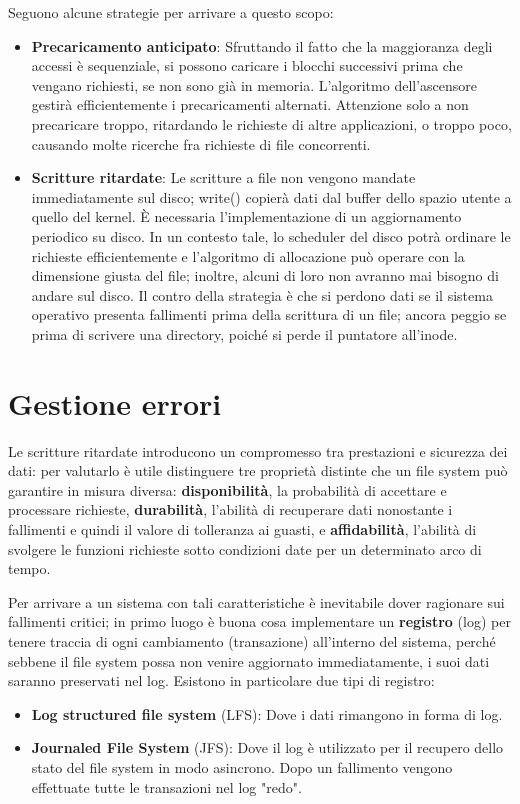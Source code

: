 Seguono alcune strategie per arrivare a questo scopo: \begin{itemize}
    \item \textbf{Precaricamento anticipato}: Sfruttando il fatto che la maggioranza degli accessi è sequenziale, si possono caricare i blocchi
    successivi prima che vengano richiesti, se non sono già in memoria. L'algoritmo dell'ascensore gestirà efficientemente i precaricamenti alternati.
    Attenzione solo a non precaricare troppo, ritardando le richieste di altre applicazioni, o troppo poco, causando molte ricerche fra richieste di
    file concorrenti.
    \item \textbf{Scritture ritardate}: Le scritture a file non vengono mandate immediatamente sul disco; write() copierà dati dal buffer dello spazio
    utente a quello del kernel. È necessaria l'implementazione di un aggiornamento periodico su disco. In un contesto tale, lo scheduler del disco potrà
    ordinare le richieste efficientemente e l'algoritmo di allocazione può operare con la dimensione giusta del file; inoltre, alcuni di loro non
    avranno mai bisogno di andare sul disco. Il contro della strategia è che si perdono dati se il sistema operativo presenta fallimenti prima della
    scrittura di un file; ancora peggio se prima di scrivere una directory, poiché si perde il puntatore all'inode.
\end{itemize}

%

\section{Gestione errori} %
Le scritture ritardate introducono un compromesso tra prestazioni e sicurezza dei dati: per valutarlo è utile distinguere tre proprietà distinte che un
file system può garantire in misura diversa: \textbf{disponibilità}, la probabilità di accettare e processare richieste, \textbf{durabilità}, l'abilità
di recuperare dati nonostante i fallimenti e quindi il valore di tolleranza ai guasti, e \textbf{affidabilità}, l'abilità di svolgere le funzioni
richieste sotto condizioni date per un determinato arco di tempo.\par
Per arrivare a un sistema con tali caratteristiche è inevitabile dover ragionare sui fallimenti critici; in primo luogo è buona cosa implementare un
\textbf{registro} (log) per tenere traccia di ogni cambiamento (transazione) all'interno del sistema, perché sebbene il file system possa non venire
aggiornato immediatamente, i suoi dati saranno preservati nel log. Esistono in particolare due tipi di registro: \begin{itemize}
    \item \textbf{Log structured file system} (LFS): Dove i dati rimangono in forma di log.
    \item \textbf{Journaled File System} (JFS): Dove il log è utilizzato per il recupero dello stato del file system in modo asincrono. Dopo un
    fallimento vengono effettuate tutte le transazioni nel log "redo".
\end{itemize}

